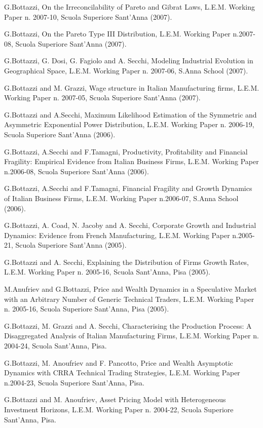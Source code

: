 \documentclass[a4paper]{article}
\begin{document}
G.Bottazzi, On the Irreconcilability of Pareto and Gibrat Laws,
L.E.M. Working Paper n. 2007-10, Scuola Superiore Sant'Anna (2007).

G.Bottazzi, On the Pareto Type III Distribution, L.E.M. Working Paper
n.2007-08, Scuola Superiore Sant'Anna (2007).

G.Bottazzi, G. Dosi, G. Fagiolo and A. Secchi, Modeling Industrial
Evolution in Geographical Space, L.E.M. Working Paper n. 2007-06,
S.Anna School (2007).

G.Bottazzi and M. Grazzi, Wage structure in Italian Manufacturing
firms, L.E.M. Working Paper n. 2007-05, Scuola Superiore Sant'Anna
(2007).

G.Bottazzi and A.Secchi, Maximum Likelihood Estimation of the
Symmetric and Asymmetric Exponential Power Distribution,
L.E.M. Working Paper n. 2006-19, Scuola Superiore Sant'Anna (2006).

G.Bottazzi, A.Secchi and F.Tamagni, Productivity, Profitability and
Financial Fragility: Empirical Evidence from Italian Business Firms,
L.E.M. Working Paper n.2006-08, Scuola Superiore Sant'Anna (2006).

G.Bottazzi, A.Secchi and F.Tamagni, Financial Fragility and Growth
Dynamics of Italian Business Firms, L.E.M. Working Paper n.2006-07,
S.Anna School (2006).

G.Bottazzi, A. Coad, N. Jacoby and A. Secchi, Corporate Growth and
Industrial Dynamics: Evidence from French Manufacturing,
L.E.M. Working Paper n.2005-21, Scuola Superiore Sant'Anna (2005).

G.Bottazzi and A. Secchi, Explaining the Distribution of Firms Growth
Rates, L.E.M. Working Paper n. 2005-16, Scuola Sant'Anna, Pisa (2005).

M.Anufriev and G.Bottazzi, Price and Wealth Dynamics in a Speculative
Market with an Arbitrary Number of Generic Technical Traders,
L.E.M. Working Paper n. 2005-16, Scuola Superiore Sant'Anna, Pisa
(2005).

G.Bottazzi, M. Grazzi and A. Secchi, Characterising the Production
Process: A Disaggregated Analysis of Italian Manufacturing Firms,
L.E.M. Working Paper n. 2004-24, Scuola Sant'Anna, Pisa.

G.Bottazzi, M. Anoufriev and F. Pancotto, Price and Wealth Asymptotic
Dynamics with CRRA Technical Trading Strategies, L.E.M. Working Paper
n.2004-23, Scuola Superiore Sant'Anna, Pisa.

G.Bottazzi and M. Anoufriev, Asset Pricing Model with Heterogeneous
Investment Horizons, L.E.M. Working Paper n. 2004-22, Scuola Superiore
Sant'Anna, Pisa.
\end{document}
